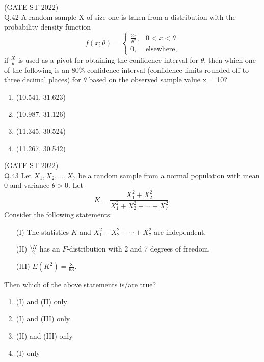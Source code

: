 \documentclass[journal,12pt,onecolumn]{IEEEtran}
\theoremstyle{remark}
\begin{document}
\hfill (GATE ST 2022)\\
	\vspace{2em}
Q.42 A random sample X of size one is taken from a distribution with the probability density function \[
f(x; \theta) = \begin{cases}
	\frac{2x}{\theta^2}, & 0 < x < \theta \\
	0, & \text{elsewhere},
\end{cases}
\]
if $\frac{X}{\theta}$ is used as a pivot for obtaining the confidence interval for $\theta$, then which one of the following is an 80\% confidence interval (confidence limits rounded off to three decimal places) for $\theta$ based on the observed sample value x = 10?
\begin{multicols}{4}
\begin{enumerate}[label=\Alph*.] 
	\item (10.541, 31.623)
	\item (10.987, 31.126)
	\item (11.345, 30.524)
	\item (11.267, 30.542)

\end{enumerate}
\end{multicols}
\hfill (GATE ST 2022)\\
	\vspace{2em}
Q.43 Let \(X_1, X_2, \ldots, X_7\) be a random sample from a normal population with mean 0 and variance \(\theta > 0\). Let
\[
K = \frac{X_1^2 + X_2^2}{X_1^2 + X_2^2 + \cdots + X_7^2}.
\]
Consider the following statements:
\begin{enumerate}[label=\Alph*.] 
	\item[(I)] The statistics \(K\) and \(X_1^2 + X_2^2 + \cdots + X_7^2\) are independent.
	\item[(II)] \(\frac{7K}{2}\) has an \(F\)-distribution with 2 and 7 degrees of freedom.
	\item[(III)] \(E(K^2) = \frac{8}{63}.\)
\end{enumerate}
Then which of the above statements is/are true?
\begin{multicols}{4}
\begin{enumerate}[label=\Alph*.] 
	\item (I) and (II) only
	\item (I) and (III) only
	\item (II) and (III) only
	\item (I) only

\end{enumerate}
\end{multicols}
\end{document}
